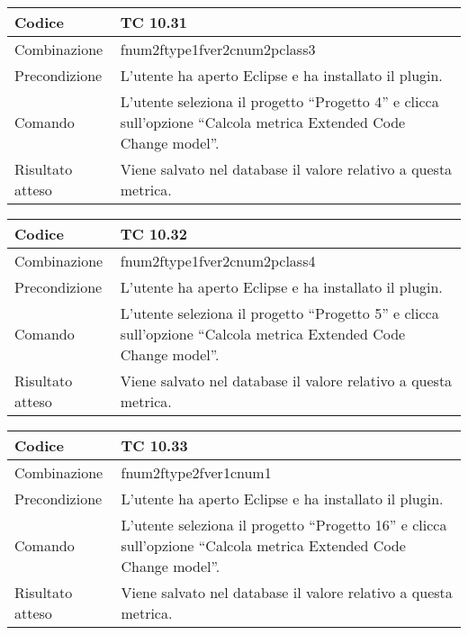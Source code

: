 \begin{table}[ht]
\begin{tabular}{|p{3cm}|p{9cm}|}
\hline
\cellcolor{lightgray}Codice				& TC 10.31								\\
\hline
\cellcolor{lightgray}Combinazione		& fnum2ftype1fver2cnum2pclass3									\\
\hline
\cellcolor{lightgray}Precondizione		& L'utente ha aperto Eclipse e ha installato il plugin.		\\
\hline
\cellcolor{lightgray}Comando			& L'utente seleziona il progetto ``Progetto 4''  e clicca sull'opzione ``Calcola metrica Extended Code Change model''.	\\
\hline
\cellcolor{lightgray}Risultato atteso	& Viene salvato nel database il valore relativo a questa metrica.\\
\hline
\end{tabular}
\end{table}

\begin{table}[ht]
\begin{tabular}{|p{3cm}|p{9cm}|}
\hline
\cellcolor{lightgray}Codice				& TC 10.32								\\
\hline
\cellcolor{lightgray}Combinazione		& fnum2ftype1fver2cnum2pclass4									\\
\hline
\cellcolor{lightgray}Precondizione		& L'utente ha aperto Eclipse e ha installato il plugin.		\\
\hline
\cellcolor{lightgray}Comando			& L'utente seleziona il progetto ``Progetto 5''  e clicca sull'opzione ``Calcola metrica Extended Code Change model''.	\\
\hline
\cellcolor{lightgray}Risultato atteso	& Viene salvato nel database il valore relativo a questa metrica.\\
\hline
\end{tabular}
\end{table}

\begin{table}[ht]
\begin{tabular}{|p{3cm}|p{9cm}|}
\hline
\cellcolor{lightgray}Codice				& TC 10.33								\\
\hline
\cellcolor{lightgray}Combinazione		& fnum2ftype2fver1cnum1									\\
\hline
\cellcolor{lightgray}Precondizione		& L'utente ha aperto Eclipse e ha installato il plugin.		\\
\hline
\cellcolor{lightgray}Comando			& L'utente seleziona il progetto ``Progetto 16''  e clicca sull'opzione ``Calcola metrica Extended Code Change model''.	\\
\hline
\cellcolor{lightgray}Risultato atteso	& Viene salvato nel database il valore relativo a questa metrica.\\
\hline
\end{tabular}
\end{table}

